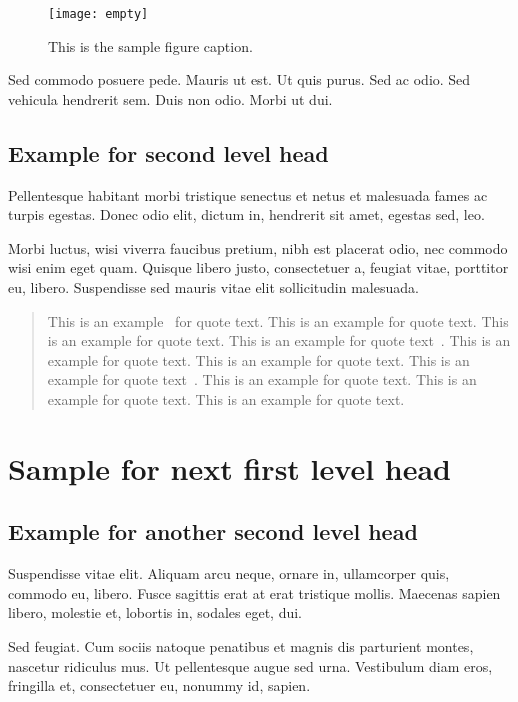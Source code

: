 \documentclass[proof]{WileyASNA-v1}
\begin{document}
\begin{figure*}[t]
\centerline{\texttt{[image: empty]}}
\caption{This is the sample figure caption.\label{fig1}}
\end{figure*}

Sed commodo posuere pede. Mauris ut est. Ut quis purus. Sed ac odio. Sed vehicula hendrerit sem. Duis non
odio. Morbi ut dui.  

\subsection{Example for second level head}

Pellentesque habitant morbi tristique senectus et netus et malesuada fames ac turpis egestas. Donec odio elit, dictum
in, hendrerit sit amet, egestas sed, leo. 

Morbi luctus, wisi viverra faucibus pretium, nibh est placerat odio, nec commodo wisi enim eget quam. Quisque
libero justo, consectetuer a, feugiat vitae, porttitor eu, libero. Suspendisse sed mauris vitae elit sollicitudin malesuada.

\begin{quote}
This is an example~\citep{Bettonvil2003,Rutten2007} for quote text. This is an example for quote text. This is an example for quote text. This is an example for quote text~\cite{Rutten2007}. This is an example for quote text. This is an example for quote text. This is an example for quote text~\cite{Rutten2007}. This is an example for quote text. This is an example for quote text. This is an example for quote text. 
\end{quote}

\section{Sample for next first level head}\label{sec3}

\subsection{Example for another second level head}

Suspendisse vitae elit. Aliquam arcu neque, ornare in, ullamcorper quis, commodo eu, libero. Fusce sagittis erat at
erat tristique mollis. Maecenas sapien libero, molestie et, lobortis in, sodales eget, dui. 

Sed feugiat. Cum sociis natoque penatibus et magnis dis parturient montes, nascetur ridiculus mus. Ut pellentesque
augue sed urna. Vestibulum diam eros, fringilla et, consectetuer eu, nonummy id, sapien. 
\end{document}
